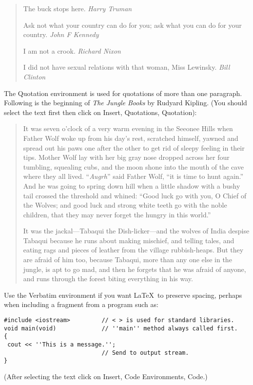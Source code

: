 \begin{quote}
The buck stops here. \emph{Harry Truman}

Ask not what your country can do for you; ask what you can do for your
country. \emph{John F Kennedy}

I am not a crook. \emph{Richard Nixon}

I did not have sexual relations with that woman, Miss Lewinsky. \emph{Bill Clinton}
\end{quote}

The Quotation environment is used for quotations of more than one paragraph. Following
is the beginning of \emph{The Jungle Books} by Rudyard Kipling. (You should select
the text first then click on Insert, Quotations, Quotation):

\begin{quotation}
It was seven o'clock of a very warm evening in the Seeonee Hills when Father Wolf woke
up from his day's rest, scratched himself, yawned  and spread out his paws one after
the other to get rid of sleepy feeling in their tips. Mother Wolf lay with her big gray
nose dropped across her four tumbling, squealing cubs, and the moon shone into the
mouth of the cave where they all lived. ``\emph{Augrh}'' said Father Wolf, ``it is time
to hunt again.'' And he was going to spring down hill when a little shadow with a bushy
tail crossed the threshold and whined: ``Good luck go with you, O Chief of the Wolves;
and good luck and strong white teeth go with the noble children, that they may never
forget the hungry in this world.''

It was the jackal---Tabaqui the Dish-licker---and the wolves of India despise Tabaqui
because he runs about making mischief, and telling tales, and eating rags and pieces of
leather from the village rubbish-heaps. But they are afraid of him too, because
Tabaqui, more than any one else in the jungle, is apt to go mad, and then he forgets
that he was afraid of anyone, and runs through the forest biting everything in his way.
\end{quotation}

Use the Verbatim environment if you want \LaTeX\ to preserve spacing, perhaps when
including a fragment from a program such as:
\begin{verbatim}
#include <iostream>         // < > is used for standard libraries.
void main(void)             // ''main'' method always called first.
{
 cout << ''This is a message.'';
                            // Send to output stream.
}
\end{verbatim}
(After selecting the text click on Insert, Code Environments, Code.)


